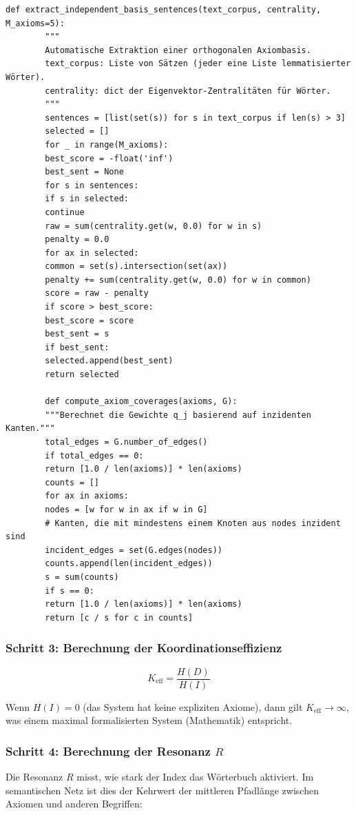 \documentclass[12pt,a4paper]{article}
\begin{document}
	\begin{lstlisting}[caption={Funktion zur Extraktion der unabhängigen Axiombasis}, label={lst:basis}]
		def extract_independent_basis_sentences(text_corpus, centrality, M_axioms=5):
		"""
		Automatische Extraktion einer orthogonalen Axiombasis.
		text_corpus: Liste von Sätzen (jeder eine Liste lemmatisierter Wörter).
		centrality: dict der Eigenvektor-Zentralitäten für Wörter.
		"""
		sentences = [list(set(s)) for s in text_corpus if len(s) > 3]
		selected = []
		for _ in range(M_axioms):
		best_score = -float('inf')
		best_sent = None
		for s in sentences:
		if s in selected:
		continue
		raw = sum(centrality.get(w, 0.0) for w in s)
		penalty = 0.0
		for ax in selected:
		common = set(s).intersection(set(ax))
		penalty += sum(centrality.get(w, 0.0) for w in common)
		score = raw - penalty
		if score > best_score:
		best_score = score
		best_sent = s
		if best_sent:
		selected.append(best_sent)
		return selected
		
		def compute_axiom_coverages(axioms, G):
		"""Berechnet die Gewichte q_j basierend auf inzidenten Kanten."""
		total_edges = G.number_of_edges()
		if total_edges == 0:
		return [1.0 / len(axioms)] * len(axioms)
		counts = []
		for ax in axioms:
		nodes = [w for w in ax if w in G]
		# Kanten, die mit mindestens einem Knoten aus nodes inzident sind
		incident_edges = set(G.edges(nodes))
		counts.append(len(incident_edges))
		s = sum(counts)
		if s == 0:
		return [1.0 / len(axioms)] * len(axioms)
		return [c / s for c in counts]
	\end{lstlisting}
	
	\subsubsection{Schritt 3: Berechnung der Koordinationseffizienz}
	
	\[
	\boxed{
		K_{\mathrm{eff}} = \frac{H(D)}{H(I)}
	}
	\]
	
	Wenn \(H(I) = 0\) (das System hat keine expliziten Axiome), dann gilt \(K_{\mathrm{eff}} \to \infty\), was einem maximal formalisierten System (Mathematik) entspricht.
	
	\subsubsection{Schritt 4: Berechnung der Resonanz \(R\)}
	
	Die Resonanz \(R\) misst, wie stark der Index das Wörterbuch aktiviert. Im semantischen Netz ist dies der Kehrwert der mittleren Pfadlänge zwischen Axiomen und anderen Begriffen:
	
\end{document}
